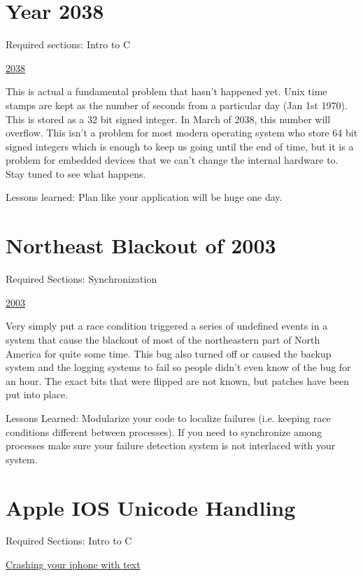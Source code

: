 \section{Year 2038}

Required sections: Intro to C

\href{https://en.wikipedia.org/wiki/Year_2038_problem}{2038}

This is actual a fundamental problem that hasn't happened yet. Unix time stamps are kept as the number of seconds from a particular day (Jan 1st 1970). This is stored as a 32 bit signed integer. In March of 2038, this number will overflow. This isn't a problem for most modern operating system who store 64 bit signed integers which is enough to keep us going until the end of time, but it is a problem for embedded devices that we can't change the internal hardware to. Stay tuned to see what happens.

Lessons learned: Plan like your application will be huge one day.


\section{Northeast Blackout of 2003}

Required Sections: Synchronization

\href{https://en.wikipedia.org/wiki/Northeast_blackout_of_2003}{2003}

Very simply put a race condition triggered a series of undefined events in a system that cause the blackout of most of the northeastern part of North America for quite some time. This bug also turned off or caused the backup system and the logging systems to fail so people didn't even know of the bug for an hour. The exact bits that were flipped are not known, but patches have been put into place.

Lessons Learned: Modularize your code to localize failures (i.e. keeping race conditions different between processes). If you need to synchronize among processes make sure your failure detection system is not interlaced with your system.


\section{Apple IOS Unicode Handling}

Required Sections: Intro to C

\href{http://appleinsider.com/articles/15/05/26/bug-in-ios-notifications-handling-crashes-iphones-with-a-simple-text}{Crashing your iphone with text}

